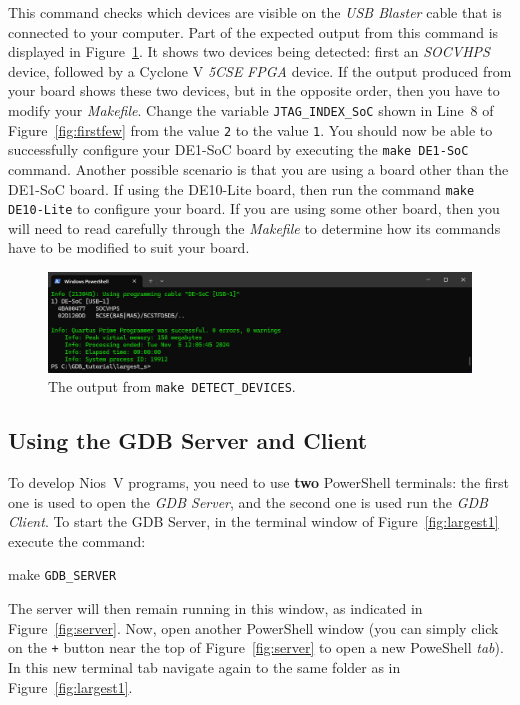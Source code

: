 \documentclass[11pt, twoside, pdftex]{article}
\begin{document}
{This command checks which devices are visible on the {\it USB Blaster} cable that is connected to
your computer. Part of the expected output from this command is displayed in
Figure~\ref{fig:detect}. It shows 
two devices being detected: first an {\it SOCVHPS} device, followed by a Cyclone V {\it 5CSE} 
{\it FPGA} device.  If the output produced from your board shows these two devices, but in the 
opposite order, then you have to modify your {\it Makefile}.
Change the variable \texttt{JTAG\_INDEX\_SoC} shown in Line~8 of 
Figure~\ref{fig:firstfew} from the value \texttt{2} to the value \texttt{1}. You should now 
be able to successfully configure your DE1-SoC board by executing the \texttt{make DE1-SoC}
command. Another possible scenario is that you are using a board other 
than the DE1-SoC board. If using the DE10-Lite board, then run the 
command \texttt{make DE10-Lite} to configure your board. If you are using some other board, 
then you will need to read carefully through the {\it Makefile} to determine how its
commands have to be modified to suit your board. 

\begin{figure}[h]
    \begin{center}
        \includegraphics[scale=.55]{figures/detect.png}
        \caption{The output from \texttt{make DETECT\_DEVICES}.}
        \label{fig:detect}
    \end{center}
\end{figure}

\subsection{Using the GDB Server and Client}
\label{sec:doit}

To develop Nios~V programs, you need to use {\bf two} PowerShell terminals: the first one
is used to open the {\it GDB Server}, and the second one is used run the {\it GDB Client}. 
To start the GDB Server, in the terminal window of Figure~\ref{fig:largest1} execute the command:

make \texttt{GDB\_SERVER}

The server will then remain running in this window, as indicated in Figure~\ref{fig:server}. 
Now, open another PowerShell window (you can simply click on the \texttt{+} button near the 
top of Figure~\ref{fig:server} to open a new PoweShell {\it tab}). In this new terminal 
tab navigate again to the same folder as in Figure~\ref{fig:largest1}. 

}
\end{document}
